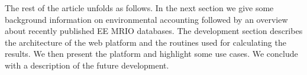 The rest of the article unfolds as follows. In the next section we give some background information on environmental accounting followed by an
overview about recently published EE MRIO databases. 
The development section describes the architecture of the
web platform and the routines used for calculating the results. We then present
the platform and highlight some use cases. We conclude with a description of
the future development.